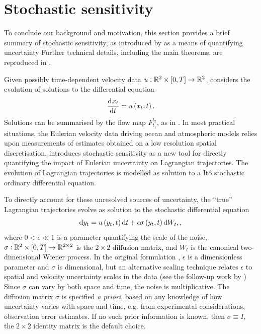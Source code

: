 \section{Stochastic sensitivity}\label{sec:s2_summ}
To conclude our background and motivation, this section provides a brief summary of stochastic sensitivity, as introduced by \citet{Balasuriya_2020_StochasticSensitivityComputable} as a means of quantifying uncertainty
Further technical details, including the main theorems, are reproduced in .

Given possibly time-dependent velocity data \(u: \mathbb{R}^2 \times [0,T] \to \mathbb{R}^2\), \citet{Balasuriya_2020_StochasticSensitivityComputable} considers the evolution of solutions to the differential equation
\[
	\dod{x_t}{t} = u\left(x_t, t\right).
\]
Solutions can be summarised by the flow map \(F_{t_1}^{t_2}\), as in .
In most practical situations, the Eulerian velocity data driving ocean and atmospheric models relies upon measurements of estimates obtained on a low resolution spatial discretisation.
\citet{Balasuriya_2020_StochasticSensitivityComputable} introduces stochastic sensitivity as a new tool for directly quantifying the impact of Eulerian uncertainty on Lagrangian trajectories.
The evolution of Lagrangian trajectories is modelled as solution to a It\^o stochastic ordinary differential equation.

To directly account for these unresolved sources of uncertainty, the ``true'' Lagrangian trajectories evolve as solution to the stochastic differential equation
\begin{equation}
	\sde{y_t}{u\left(y_t, t\right)}{\epsilon\sigma\left(y_t, t\right)},
	\label{eqn:ss_sde},
\end{equation}
where \(0 < \epsilon \ll 1\) is a parameter quantifying the scale of the noise, \(\sigma:	\mathbb{R}^2\times[0,T] \to \mathbb{R}^{2\times 2}\) is the \(2\times 2\) diffusion matrix, and \(W_t\) is the canonical two-dimensional Wiener process.
In the original formulation \citep{Balasuriya_2020_StochasticSensitivityComputable}, \(\epsilon\) is a dimensionless parameter and \(\sigma\) is dimensional, but an alternative scaling technique relates \(\epsilon\) to spatial and velocity uncertainty scales in the data (see the follow-up work by \citet{BadzaEtAl_2023_HowSensitiveAre,Balasuriya_2020_UncertaintyFinitetimeLyapunov,FangEtAl_2020_DisentanglingResolutionPrecision})
Since \(\sigma\) can vary by both space and time, the noise is multiplicative.
The diffusion matrix \(\sigma\) is specified \emph{a priori}, based on any knowledge of how uncertainty varies with space and time, e.g. from experimental considerations, observation error estimates.
If no such prior information is known, then \(\sigma \equiv I\), the \(2 \times 2\) identity matrix is the default choice.

